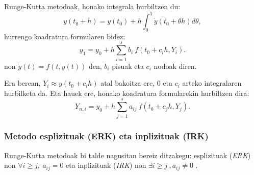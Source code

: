 Runge-Kutta metodoak, honako integrala hurbiltzen du:
\begin{equation*}
y(t_0+h)=y(t_0)+h \int_{0}^{1} \dot{y}(t_0+\theta h) d\theta,
\end{equation*} 
 hurrengo koadratura formularen bidez:
\begin{equation*}
 y_{1}=y_0+h\sum^s_{i=1}{b_i \ f(t_0+c_ih,Y_{i})}.
\end{equation*}
non $\dot{y}(t)=f(t,y(t))$ den, $b_i$ pisuak eta $c_i$ nodoak diren.

Era berean, $Y_{i} \approx y(t_0+c_ih)$ atal bakoitza ere, $0$ eta $c_i$ arteko integralaren hurbilketa da. Eta hauek ere, honako koadratura formularekin hurbiltzen dira:
\begin{equation*}
Y_{n,i}=y_0+h \sum_{j=1}^{s} a_{ij} \ f(t_0+c_jh,Y_{j}).
\end{equation*}

\subsubsection*{Metodo esplizituak (ERK) eta inplizituak (IRK)}
Runge-Kutta metodoak bi talde nagusitan bereiz ditzakegu: esplizituak (\emph {ERK}) non $\forall i\ge j, \ a_{ij}=0 $ eta inplizituak (\emph {IRK}) non $\exists i \ge j \ , a_{ij} \ne 0$ . 


